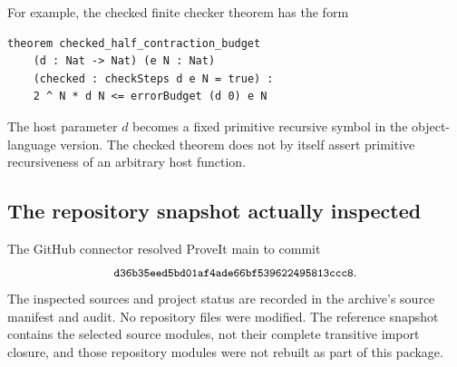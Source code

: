For example, the checked finite checker theorem has the form
\begin{lstlisting}
theorem checked_half_contraction_budget
    (d : Nat -> Nat) (e N : Nat)
    (checked : checkSteps d e N = true) :
    2 ^ N * d N <= errorBudget (d 0) e N
\end{lstlisting}
The host parameter \(d\) becomes a fixed primitive recursive
symbol in the object-language version. The checked theorem
does not by itself assert primitive recursiveness of an
arbitrary host function.

\subsection{The repository snapshot actually inspected}

The GitHub connector resolved ProveIt main to commit
\[
 \texttt{\small d36b35eed5bd01af4ade66bf539622495813ccc8}.
\]
The inspected sources and project status are recorded in
the archive's source manifest and audit. No repository
files were modified. The reference snapshot contains the
selected source modules, not their complete transitive
import closure, and those repository modules were not
rebuilt as part of this package.

